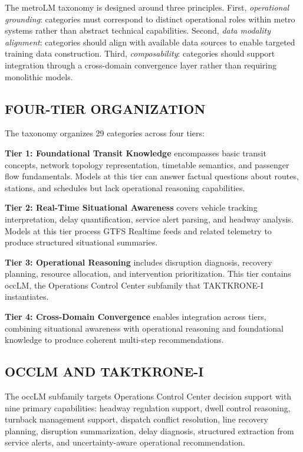 \documentclass{IEEEoj}
\begin{document}
The metroLM taxonomy is designed around three principles. First, \textit{operational grounding}: categories must correspond to distinct operational roles within metro systems rather than abstract technical capabilities. Second, \textit{data modality alignment}: categories should align with available data sources to enable targeted training data construction. Third, \textit{composability}: categories should support integration through a cross-domain convergence layer rather than requiring monolithic models.

\subsection{FOUR-TIER ORGANIZATION}

The taxonomy organizes 29 categories across four tiers:

\textbf{Tier 1: Foundational Transit Knowledge} encompasses basic transit concepts, network topology representation, timetable semantics, and passenger flow fundamentals. Models at this tier can answer factual questions about routes, stations, and schedules but lack operational reasoning capabilities.

\textbf{Tier 2: Real-Time Situational Awareness} covers vehicle tracking interpretation, delay quantification, service alert parsing, and headway analysis. Models at this tier process GTFS Realtime feeds and related telemetry to produce structured situational summaries.

\textbf{Tier 3: Operational Reasoning} includes disruption diagnosis, recovery planning, resource allocation, and intervention prioritization. This tier contains occLM, the Operations Control Center subfamily that TAKTKRONE-I instantiates.

\textbf{Tier 4: Cross-Domain Convergence} enables integration across tiers, combining situational awareness with operational reasoning and foundational knowledge to produce coherent multi-step recommendations.

\subsection{OCCLM AND TAKTKRONE-I}

The occLM subfamily targets Operations Control Center decision support with nine primary capabilities: headway regulation support, dwell control reasoning, turnback management support, dispatch conflict resolution, line recovery planning, disruption summarization, delay diagnosis, structured extraction from service alerts, and uncertainty-aware operational recommendation.
\end{document}

